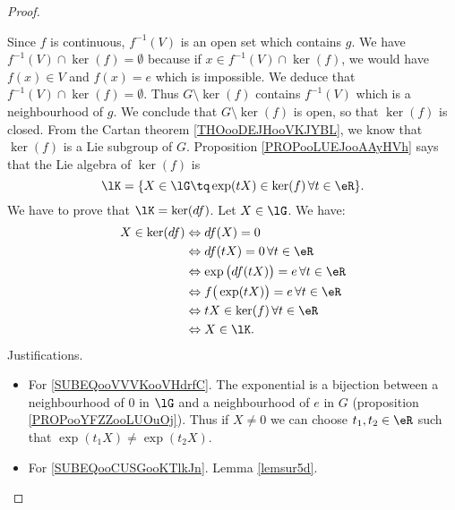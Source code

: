 \begin{proof}
\begin{subproof}
		Since \( f\) is continuous, \( f^{-1}(V)\) is an open set which contains \( g\). We have \( f^{-1}(V)\cap \ker(f)=\emptyset\) because if \( x\in f^{-1}(V)\cap\ker(f)\), we would have \( f(x)\in V\) and \( f(x)=e\) which is impossible. We deduce that \( f^{-1}(V)\cap\ker(f)=\emptyset\). Thus \( G\setminus\ker(f)\) contains \( f^{-1}(V)\) which is a neighbourhood of \( g\). We conclude that \( G\setminus \ker(f)\) is open, so that \( \ker(f)\) is closed.
		From the Cartan theorem \ref{THOooDEJHooVKJYBL}, we know that \( \ker(f)\) is a Lie subgroup of \( G\).
		Proposition \ref{PROPooLUEJooAAyHVh} says that the Lie algebra of \( \ker(f)\) is
		\begin{equation}
			\lK=\{ X\in \lG\tq \exp(tX)\in \ker(f)\,\forall t\in \eR \}.
		\end{equation}
		We have to prove that \( \lK=\ker(df)\). Let \( X\in \lG\). We have:
		\begin{subequations}
			\begin{align}
				X\in\ker(df) & \Leftrightarrow df(X)=0                                                                      \\
				             & \Leftrightarrow df(tX)=0\,\forall t\in \eR                                                   \\
				             & \Leftrightarrow \exp\big( df(tX) \big)=e\,\forall t\in \eR       \label{SUBEQooVVVKooVHdrfC} \\
				             & \Leftrightarrow f\big( \exp(tX) \big)=e\,\forall t\in \eR  \label{SUBEQooCUSGooKTlkJn}       \\
				             & \Leftrightarrow tX\in\ker(f)\,\forall t\in \eR                                               \\
				             & \Leftrightarrow X\in\lK.
			\end{align}
		\end{subequations}
		Justifications.
		\begin{itemize}
			\item For \eqref{SUBEQooVVVKooVHdrfC}. The exponential is a bijection between a neighbourhood of \( 0\) in \( \lG\) and a neighbourhood of \( e\) in \( G\) (proposition \ref{PROPooYFZZooLUOuOj}). Thus if \( X\neq 0\) we can choose \( t_1,t_2\in \eR\) such that \( \exp(t_1X)\neq \exp(t_2X)\).
			\item For \eqref{SUBEQooCUSGooKTlkJn}. Lemma \ref{lemsur5d}.
		\end{itemize}
	\end{subproof}
\end{proof}


